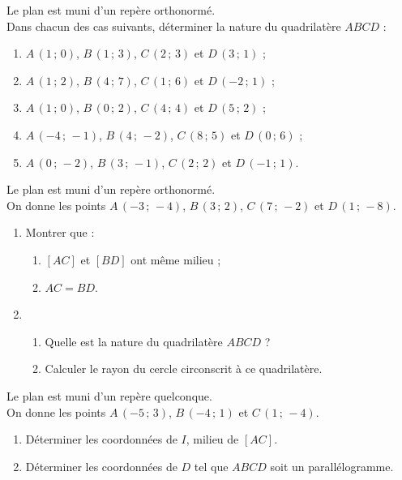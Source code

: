 \begin{multicols}{2}

\begin{exo}
Le plan est muni d'un rep\`ere orthonorm\'e.\\
Dans chacun des cas suivants, d\'eterminer la nature du quadrilat\`ere $ABCD$ :
\begin{enumerate}
 \item $A\,(1\,;\,0)$, $B\,(1\,;\,3)$, $C\,(2\,;\,3)$ et $D\,(3\,;\,1)$ ;
 \item $A\,(1\,;\,2)$, $B\,(4\,;\,7)$, $C\,(1\,;\,6)$ et $D\,(-2\,;\,1)$ ;
 \item $A\,(1\,;\,0)$, $B\,(0\,;\,2)$, $C\,(4\,;\,4)$ et $D\,(5\,;\,2)$ ;
 \item $A\,(-4\,;\,-1)$, $B\,(4\,;\,-2)$, $C\,(8\,;\,5)$ et $D\,(0\,;\,6)$ ;
 \item $A\,(0\,;\,-2)$, $B\,(3\,;\,-1)$, $C\,(2\,;\,2)$ et $D\,(-1\,;\,1)$.
\end{enumerate}

\end{exo}


\begin{exo}
 Le plan est muni d'un rep\`ere orthonorm\'e.\\
 On donne les points $A\,(-3\,;\,-4)$, $B\,(3\,;\,2)$, $C\,(7\,;\,-2)$ et $D\,(1\,;\,-8)$.
\begin{enumerate}
 \item Montrer que :
	\begin{enumerate}
	 \item $[AC]$ et $[BD]$ ont m\^eme milieu ;
	 \item $AC=BD$.
	\end{enumerate}
 \item \begin{enumerate}
        \item Quelle est la nature du quadrilat\`ere $ABCD$ ?
	\item Calculer le rayon du cercle circonscrit \`a ce quadrilat\`ere.
       \end{enumerate}


\end{enumerate}

\end{exo}



\begin{exo}\label{rep2}
 Le plan est muni d'un rep\`ere quelconque.\\
 On donne les points $A\,(-5\,;\,3)$, $B\,(-4\,;\,1)$ et $C\,(1\,;\,-4)$.
\begin{enumerate}
 \item D\'eterminer les coordonn\'ees de $I$, milieu de $[AC]$.
 \item D\'eterminer les coordonn\'ees de $D$ tel que $ABCD$ soit un parall\'elogramme.
\end{enumerate}


\end{exo}
\end{multicols}
